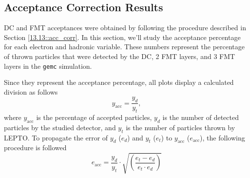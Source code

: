 \subsection{Acceptance Correction Results}
\label{14.20::acceptance_correction_results}
    DC and FMT acceptances were obtained by following the procedure described in Section \ref{13.13::acc_corr}.
    In this section, we'll study the acceptance percentage for each electron and hadronic variable.
    These numbers represent the percentage of thrown particles that were detected by the DC, 2 FMT layers, and 3 FMT layers in the \texttt{gemc} simulation.

    Since they represent the acceptance percentage, all plots display a calculated division as follows
    \begin{equation*}
        y_\text{acc} = \frac{y_d}{y_t},
    \end{equation*}
    where $y_\text{acc}$ is the percentage of accepted particles, $y_d$ is the number of detected particles by the studied detector, and $y_t$ is the number of particles thrown by LEPTO.
    To propagate the error of $y_d$ ($e_d$) and $y_t$ ($e_t$) to $y_\text{acc}$ ($e_\text{acc}$), the following procedure is followed
    \begin{equation}
        e_\text{acc} = \frac{y_d}{y_t} \cdot \sqrt{
            \left(\frac{e_t - e_d}{e_t\cdot e_d}\right)
        }
        \label{eq::14.20::acc_error}
    \end{equation}

    
    
